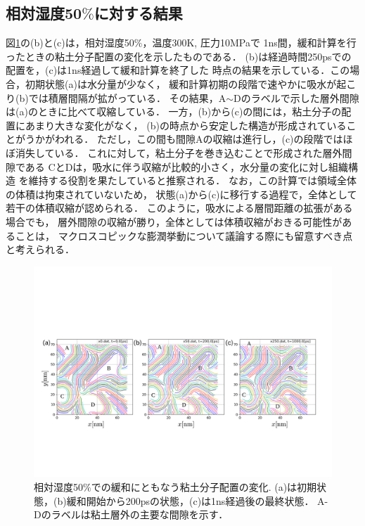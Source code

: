 \subsection{相対湿度50$\%$に対する結果}
図\ref{fig:fig3}の(b)と(c)は，相対湿度50$\%$，温度300K, 圧力10MPaで
1ns間，緩和計算を行ったときの粘土分子配置の変化を示したものである．
(b)は経過時間250psでの配置を，(c)は1ns経過して緩和計算を終了した
時点の結果を示している．この場合，初期状態(a)は水分量が少なく，
緩和計算初期の段階で速やかに吸水が起こり(b)では積層間隔が拡がっている．
その結果，A$\sim$Dのラベルで示した層外間隙は(a)のときに比べて収縮している．
一方，(b)から(c)の間には，粘土分子の配置にあまり大きな変化がなく，
(b)の時点から安定した構造が形成されていることがうかがわれる．
ただし，この間も間隙Aの収縮は進行し，(c)の段階ではほぼ消失している．
これに対して，粘土分子を巻き込むことで形成された層外間隙である
CとDは，吸水に伴う収縮が比較的小さく，水分量の変化に対し組織構造
を維持する役割を果たしていると推察される．
なお，この計算では領域全体の体積は拘束されていないため，
状態(a)から(c)に移行する過程で，全体として若干の体積収縮が認められる．
このように，吸水による層間距離の拡張がある場合でも，
層外間隙の収縮が勝り，全体としては体積収縮がおきる可能性があることは，
マクロスコピックな膨潤挙動について議論する際にも留意すべき点と考えられる．
\begin{figure}[t]
	\begin{center}
	\includegraphics[width=1.0\linewidth]{Figs/fig3.pdf} 
	\end{center}
	\caption{
		相対湿度50$\%$での緩和にともなう粘土分子配置の変化.  
		(a)は初期状態，(b)緩和開始から200psの状態，(c)は1ns経過後の最終状態．
		A-Dのラベルは粘土層外の主要な間隙を示す．
	} 
	\label{fig:fig3}
\end{figure}
